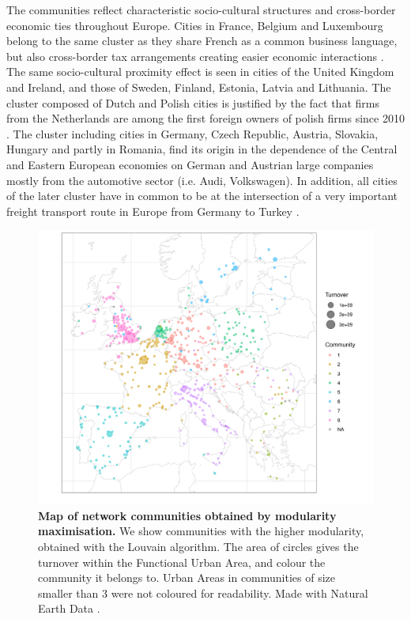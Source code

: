 \documentclass[10pt,letterpaper]{article}
\begin{document}
The communities reflect characteristic socio-cultural structures and cross-border economic ties throughout Europe. Cities in France, Belgium and Luxembourg belong to the same cluster as they share French as a common business language, but also cross-border tax arrangements creating easier economic interactions \cite{DecovilleDurand2019}. The same socio-cultural proximity effect is seen in cities of the United Kingdom and Ireland, and those of Sweden, Finland, Estonia, Latvia and Lithuania. The cluster composed of Dutch and Polish cities is justified by the fact that firms from the Netherlands are among the first foreign owners of polish firms since 2010 \cite{2020Zdanowska}. The cluster including cities in Germany, Czech Republic, Austria, Slovakia, Hungary and partly in Romania, find its origin in the dependence of the Central and Eastern European economies on German and Austrian large companies mostly from the automotive sector (i.e. Audi, Volkswagen). In addition, all cities of the later cluster have in common to be at the intersection of a very important freight transport route in Europe from Germany to Turkey \cite{Zdanowska2017}. 


\begin{figure}
    \begin{center}
    \includegraphics[width=\linewidth]{figures/Fig2.png}
    \end{center}
    \caption{{\bf Map of network communities obtained by modularity maximisation.} We show communities with the higher modularity, obtained with the Louvain algorithm. The area of circles gives the turnover within the Functional Urban Area, and colour the community it belongs to. Urban Areas in communities of size smaller than 3 were not coloured for readability. Made with Natural Earth Data \cite{naturalearth}.}
    \label{fig:fig2}
\end{figure}
\end{document}

